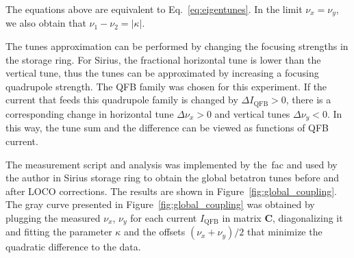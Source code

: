 The equations above are equivalent to Eq.~\eqref{eq:eigentunes}. In the limit $\nu_x = \nu_y$, we also obtain that $\nu_1 - \nu_2 = |\kappa|$.

The tunes approximation can be performed by changing the focusing strengths in the storage ring. For Sirius, the fractional horizontal tune is lower than the vertical tune, thus the tunes can be approximated by increasing a focusing quadrupole strength. The QFB family was chosen for this experiment. If the current that feeds this quadrupole family is changed by $\Delta I_{\mathrm{QFB}}>0$, there is a corresponding change in horizontal tune $\Delta\nu_x > 0$ and vertical tunes $\Delta\nu_y < 0$. In this way, the tune sum and the difference can be viewed as functions of QFB current.

The measurement script and analysis was implemented by the~\gls{fac} and used by the author in Sirius storage ring to obtain the global betatron tunes before and after LOCO corrections. The results are shown in Figure~\ref{fig:global_coupling}. The gray curve presented in Figure~\ref{fig:global_coupling} was obtained by plugging the measured $\nu_x$, $\nu_y$ for each current $I_{\mathrm{QFB}}$ in matrix $\mathbf{C}$, diagonalizing it and fitting the parameter $\kappa$ and the offsets $(\nu_x+\nu_y)/2$ that minimize the quadratic difference to the data.
